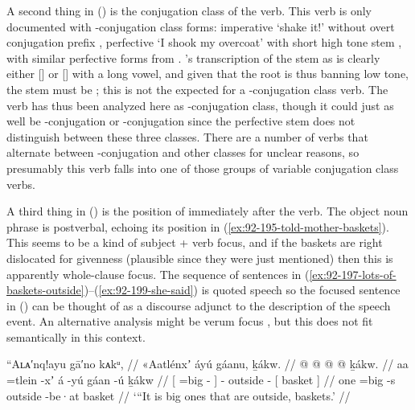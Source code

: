 A second thing in (\lastx) is the conjugation class of the verb.
This verb is only documented with -conjugation class forms: imperative  ‘shake it!’ without overt conjugation prefix \parencite[186.2562]{story-naish:1973}, perfective  ‘I shook my overcoat’ with short high tone stem  \parencite[186.2563]{story-naish:1973}, with similar perfective forms from \textcites[03/88]{leer:1973}[183]{leer:1976}.
\citeauthor{swanton:1909}’s transcription of the stem as  is clearly either [] or [] with a long vowel, and given that the root is  thus banning low tone, the stem must be ; this is not the  expected for a -conjugation class verb.
The verb has thus been analyzed here as -conjugation class, though it could just as well be -conjugation or -conjugation since the perfective stem does not distinguish between these three classes.
There are a number of verbs that alternate between -conjugation and other classes for unclear reasons, so presumably this verb falls into one of those groups of variable conjugation class verbs.

A third thing in (\lastx) is the position of  immediately after the verb.
The object noun phrase is postverbal, echoing its position in (\ref{ex:92-195-told-mother-baskets}).
This seems to be a kind of subject + verb focus, and if the baskets are right dislocated for givenness (plausible since they were just mentioned) then this is apparently whole-clause focus.
The sequence of sentences in (\ref{ex:92-197-lots-of-baskets-outside})–(\ref{ex:92-199-she-said}) is quoted speech so the focused sentence in (\lastx) can be thought of as a discourse adjunct to the description of the speech event.
An alternative analysis might be verum focus \parencites{lohnstein:2016}, but this does not fit semantically in this context.

\ex\label{ex:92-197-lots-of-baskets-outside}%
%
\begingl
	\glpreamble	“Aʟᴀ′nq!ayu gā′no kᴀkᵘ, //
	\glpreamble	«\!Aatlénxʼ áyú gáanu, ḵákw. //
	\gla	{}  @ {} @ {} {}  @ {}
		 @ {}
		{} ḵákw. {} //
	\glb	{} aa =tlein -xʼ {} á -yú
		gáan -ú
		{} ḵákw {} //
	\glc	{}[  =big - {}]  -
		outside -
		{}[ basket {}] //
	\gld	{} one =big -s {}  {}
		outside -be·at
		{} basket {} //
	\glft	‘“It is big ones that are outside, baskets.’
		//
\endgl
\xe

